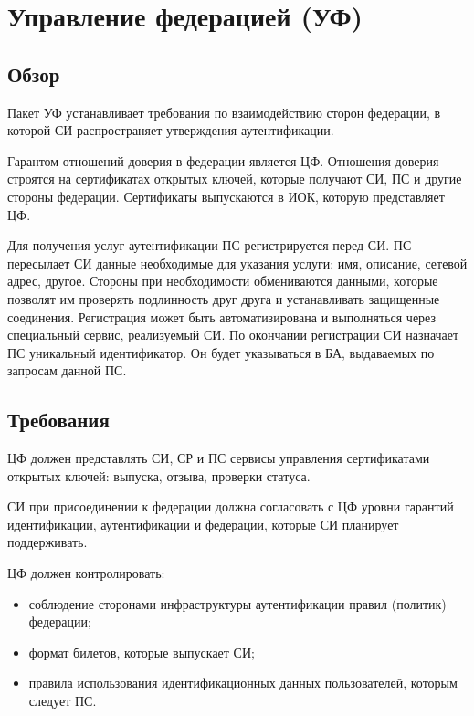 \section{Управление федерацией (УФ)}\label{FM}

\subsection{Обзор}\label{FM.Intro}

Пакет УФ устанавливает требования по взаимодействию сторон федерации, в которой 
СИ распространяет утверждения аутентификации. 

Гарантом отношений доверия в федерации является ЦФ.
Отношения доверия строятся на сертификатах открытых ключей,
которые получают СИ, ПС и другие стороны федерации.
%
Сертификаты выпускаются в ИОК, которую представляет ЦФ.

Для получения услуг аутентификации ПС регистрируется перед СИ.
%
ПС пересылает СИ данные необходимые для указания услуги: имя, описание, сетевой 
адрес, другое. Стороны при необходимости обмениваются данными, которые позволят 
им проверять подлинность друг друга и устанавливать защищенные соединения. 
%
Регистрация может быть автоматизирована и выполняться через специальный сервис,
реализуемый СИ.
%
По окончании регистрации СИ назначает ПС уникальный идентификатор. Он будет 
указываться в БА, выдаваемых по запросам данной ПС.

\subsection{Требования}\label{FM.Reqs}


ЦФ должен представлять СИ, СР и ПС сервисы управления сертификатами открытых 
ключей: выпуска, отзыва, проверки статуса. 

СИ при присоединении к федерации должна согласовать с ЦФ уровни гарантий 
идентификации, аутентификации и федерации, которые СИ планирует поддерживать.

ЦФ должен контролировать:
\begin{itemize}
\item
соблюдение сторонами инфраструктуры аутентификации правил (политик) федерации;
\item
формат билетов, которые выпускает СИ;
\item
правила использования идентификационных данных пользователей, которым следует ПС.
\end{itemize}

